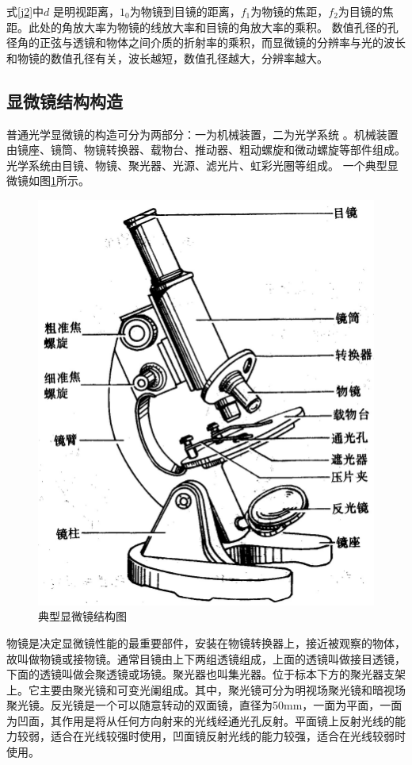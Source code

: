 式\ref{j2}中$d$ 是明视距离，$1_{0}$为物镜到目镜的距离，$f_{1}$为物镜的焦距，$f_{2}$为目镜的焦距。此处的角放大率为物镜的线放大率和目镜的角放大率的乘积。
数值孔径的孔径角的正弦与透镜和物体之间介质的折射率的乘积，而显微镜的分辨率与光的波长和物镜的数值孔径有关，波长越短，数值孔径越大，分辨率越大。\cite{fenbianlv}


\subsection{显微镜结构构造}
普通光学显微镜的构造可分为两部分：一为机械装置，二为光学系统 。机械装置由镜座、镜筒、物镜转换器、载物台、推动器、粗动螺旋和微动螺旋等部件组成。光学系统由目镜、物镜、聚光器、光源、滤光片、虹彩光圈等组成。
一个典型显微镜如图\ref{fig:mi_1}所示。
\begin{figure}[h]
\centering
\includegraphics[width=0.7\linewidth]{Figure/mi_1}
\caption{典型显微镜结构图}
\label{fig:mi_1}
\end{figure}


物镜是决定显微镜性能的最重要部件，安装在物镜转换器上，接近被观察的物体，故叫做物镜或接物镜。通常目镜由上下两组透镜组成，上面的透镜叫做接目透镜，下面的透镜叫做会聚透镜或场镜。聚光器也叫集光器。位于标本下方的聚光器支架上。它主要由聚光镜和可变光阑组成。其中，聚光镜可分为明视场聚光镜和暗视场聚光镜。反光镜是一个可以随意转动的双面镜，直径为50mm，一面为平面，一面为凹面，其作用是将从任何方向射来的光线经通光孔反射。平面镜上反射光线的能力较弱，适合在光线较强时使用，凹面镜反射光线的能力较强，适合在光线较弱时使用。

